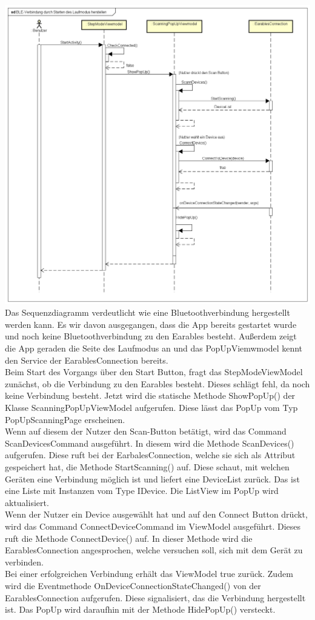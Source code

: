 \documentclass[a4paper,12pt]{article}
\begin{document}
\includegraphics[width=1.1\textwidth]{./Diagramme/Verbindungsaufbausequenzdiagramm.png}\\
Das Sequenzdiagramm verdeutlicht wie eine Bluetoothverbindung hergestellt werden kann. Es wir davon ausgegangen, dass die App bereits gestartet wurde und noch keine Bluetoothverbindung zu den Earables besteht. Außerdem zeigt die App geraden die Seite des Laufmodus an und das PopUpViemwmodel kennt den Service der EarablesConnection bereits.\\
Beim Start des Vorgangs über den Start Button, fragt das StepModeViewModel zunächst, ob die Verbindung zu den \gls{Earables} besteht. Dieses schlägt fehl, da noch keine Verbindung besteht.
Jetzt wird die statische Methode ShowPopUp() der Klasse ScanningPopUpViewModel aufgerufen. Diese lässt das PopUp vom Typ PopUpScanningPage erscheinen.\\

Wenn auf diesem der Nutzer den Scan-Button betätigt, wird das Command ScanDevicesCommand ausgeführt. In diesem wird die Methode ScanDevices() aufgerufen. Diese ruft bei der EarbalesConnection, welche sie sich als Attribut gespeichert hat, die Methode StartScanning() auf. 
Diese schaut, mit welchen Geräten eine Verbindung möglich ist und liefert eine DeviceList zurück. Das ist eine Liste mit Instanzen vom Type IDevice.
Die ListView im PopUp wird aktualisiert.\\
Wenn der Nutzer ein Device ausgewählt hat und auf den Connect Button drückt, wird das Command ConnectDeviceCommand im ViewModel ausgeführt. Dieses ruft die Methode ConnectDevice() auf. In dieser Methode wird die EarablesConnection angesprochen, welche versuchen soll, sich mit dem Gerät zu verbinden.\\
Bei einer erfolgreichen Verbindung erhält das ViewModel true zurück. Zudem wird die Eventmethode OnDeviceConnectionStateChanged() von der EarablesConnection aufgerufen. Diese signalisiert, das die Verbindung hergestellt ist. Das PopUp wird daraufhin mit der Methode HidePopUp() versteckt.
\end{document}
